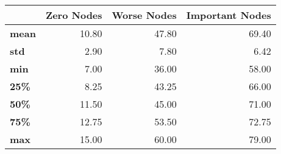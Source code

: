 \begin{tabular}{lrrr}
\toprule
{} &  Zero Nodes &  Worse Nodes &  Important Nodes \\
\midrule
\textbf{mean} &       10.80 &        47.80 &            69.40 \\
\textbf{std } &        2.90 &         7.80 &             6.42 \\
\textbf{min } &        7.00 &        36.00 &            58.00 \\
\textbf{25\% } &        8.25 &        43.25 &            66.00 \\
\textbf{50\% } &       11.50 &        45.00 &            71.00 \\
\textbf{75\% } &       12.75 &        53.50 &            72.75 \\
\textbf{max } &       15.00 &        60.00 &            79.00 \\
\bottomrule
\end{tabular}

